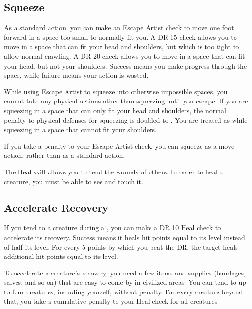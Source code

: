     \subsection{Squeeze}
        As a standard action, you can make an Escape Artist check to move one foot forward in a space too small to normally fit you. A DR 15 check allows you to move in a space that can fit your head and shoulders, but which is too tight to allow normal crawling. A DR 20 check allows you to move in a space that can fit your head, but not your shoulders. Success means you make progress through the space, while failure means your action is wasted.

        While using Escape Artist to squeeze into otherwise impossible spaces, you cannot take any physical actions other than squeezing until you escape. If you are squeezing in a space that can only fit your head and shoulders, the normal penalty to physical defenses for squeezing is doubled to . You are treated as \helpless while squeezing in a space that cannot fit your shoulders.

        If you take a  penalty to your Escape Artist check, you can squeeze as a move action, rather than as a standard action.

\newpage
{}
        The Heal skill allows you to tend the wounds of others. In order to heal a creature, you must be able to see and touch it.

    \subsection{Accelerate Recovery}\label{Accelerate Recovery}
        If you tend to a creature during a , you can make a DR 10 Heal check to accelerate its recovery.
        Success means it heals hit points equal to its level instead of half its level.
        For every 5 points by which you beat the DR, the target heals additional hit points equal to its level.

        To accelerate a creature's recovery, you need a few items and supplies (bandages, salves, and so on) that are easy to come by in civilized areas.
        You can tend to up to four creatures, including yourself, without penalty.
        For every creature beyond that, you take a cumulative  penalty to your Heal check for all creatures.

